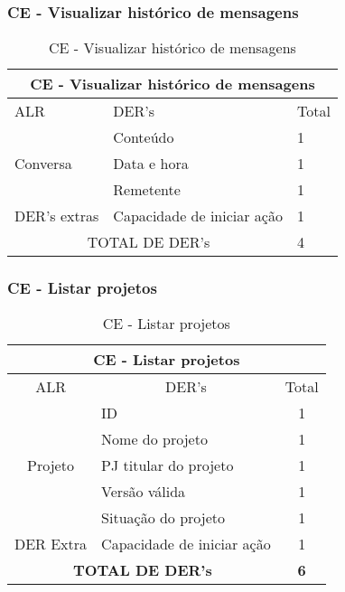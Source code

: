 \subsubsection{CE - Visualizar histórico de mensagens}
\begin{table}[!h]
\centering
\caption{CE - Visualizar histórico de mensagens}
\label{ee_enviar_mensagens}
\begin{tabular}{|l|l|l|}
\hline
\multicolumn{3}{|c|}{CE - Visualizar histórico de mensagens}                 \\ \hline
ALR                           & DER's                         & Total \\ \hline
\multirow{3}{*}{Conversa}     & Conteúdo                      & 1     \\ \cline{2-3} 
                              & Data e hora                   & 1     \\ \cline{2-3} 
                              & Remetente                     & 1     \\ \cline{2-3} 
DER's extras & Capacidade de iniciar ação    & 1     \\ \hline
\multicolumn{2}{|c|}{TOTAL DE DER's}                          & 4    \\ \hline
\end{tabular}
\end{table}
 

 
  \subsubsection{CE - Listar projetos}

\begin{table}[!h]
\centering
\caption{CE - Listar projetos}
\label{ce_listar_projeto}
\begin{tabular}{|c|l|c|}
\hline
\multicolumn{3}{|c|}{CE - Listar projetos}                    \\ \hline
ALR                      & \multicolumn{1}{c|}{DER's} & Total \\ \hline
\multirow{5}{*}{Projeto} & ID                         & 1     \\ \cline{2-3} 
                         & Nome do projeto            & 1     \\ \cline{2-3} 
                         & PJ titular do projeto      & 1     \\ \cline{2-3} 
                         & Versão válida              & 1     \\ \cline{2-3} 
                         & Situação do projeto        & 1     \\ \hline
DER Extra                & Capacidade de iniciar ação & 1     \\ \hline
\multicolumn{2}{|c|}{\textbf{TOTAL DE DER's}}                  & \textbf{6}     \\ \hline
\end{tabular}
\end{table}



